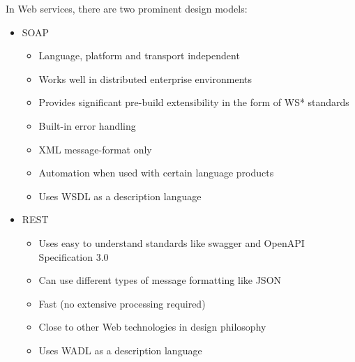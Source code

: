     In Web services, there are two prominent design models:
    \begin{itemize}
        \item SOAP
        \begin{itemize}
            \item Language, platform and transport independent
            \item Works well in distributed enterprise environments
            \item Provides significant pre-build extensibility in the
            form of WS* standards
            \item Built-in error handling
            \item XML message-format only
            \item Automation when used with certain language products
            \item Uses WSDL as a description language
        \end{itemize}
        \item REST
        \begin{itemize}
            \item Uses easy to understand standards like swagger and OpenAPI
            Specification 3.0
            \item Can use different types of message formatting like JSON
            \item Fast (no extensive processing required)
            \item Close to other Web technologies in design philosophy
            \item Uses WADL as a description language
        \end{itemize}
    \end{itemize}
